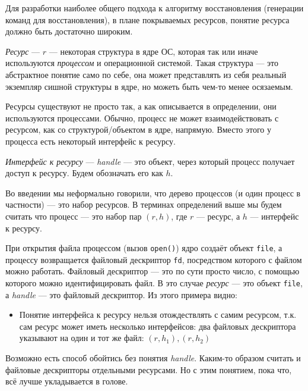 Для разработки наиболее общего подхода к алгоритму восстановления (генерации команд для восстановления), в плане покрываемых ресурсов, понятие ресурса должно быть достаточно широким.

\begin{defn}
\label{def:resource}
\emph{Ресурс} --- $r$ --- некоторая структура в ядре ОС, которая так или иначе используются \emph{процессом} и операционной системой. 
Такая структура --- это абстрактное понятие само по себе, она может представлять из себя реальный экземпляр сишной структуры в ядре, но можеть быть чем-то менее осязаемым.
\end{defn}

Ресурсы существуют не просто так, а как описывается в определении, они используются процессами. Обычно, процесс не может взаимодействовать с ресурсом, как со структурой/объектом в ядре, напрямую. Вместо этого у процесса есть некоторый интерфейс к ресурсу.

\begin{defn}
\emph{Интерфейс к ресурсу} --- \textit{handle} --- это объект, через который процесс получает доступ к ресурсу. Будем обозначать его как $h$.
\end{defn}

Во введении мы неформально говорили, что дерево процессов (и один процесс в частности) --- это набор ресурсов. В терминах определений выше мы будем считать что процесс --- это набор пар $(r, h)$, где $r$ --- ресурс, а $h$ --- интерфейс к ресурсу.

\begin{exmp}
При открытия файла процессом (вызов \texttt{open()}) ядро создаёт объект \texttt{file}, а процессу возвращается файловый дескриптор \texttt{fd}, посредством которого с файлом можно работать. Файловый дескриптор --- это по сути просто число, с помощью которого можно идентифицировать файл. В это случае \emph{ресурс} --- это объект \texttt{file}, а \emph{handle} --- это файловый дескриптор. Из этого примера видно:
\begin{itemize}
	\item Понятие интерфейса к ресурсу нельзя отождествлять с самим ресурсом, т.к. сам ресурс может иметь несколько интерфейсов: два файловых дескриптора указывают на один и тот же файл: $(r, h_1), (r, h_2)$
\end{itemize}
\end{exmp}

\begin{note}
Возможно есть способ обойтись без понятия \emph{handle}. Каким-то образом считать и файловые дескрипторы отдельными ресурсами. Но с этим понятием, пока что, всё лучше укладывается в голове.
\end{note}

